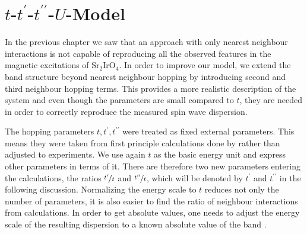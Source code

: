 \section{$t$-$t^{\prime}$-$t^{\prime \prime}$-$U$-Model}

In the previous chapter we saw that an approach with only nearest neighbour interactions  is not capable of reproducing all the observed features 
in the magnetic excitations of  Sr$_2$IrO$_4$.
In order to improve our model, we extend the band structure beyond nearest neighbour hopping by introducing second and third neighbour hopping terms.
This provides a more realistic description of the system and even though the parameters are small compared to $t$, 
they are needed in order to correctly reproduce the measured spin wave dispersion.


The hopping parameters $t,t^{\prime},t^{\prime \prime}$ were treated as fixed external parameters.
This means they were taken from first principle calculations done by 
\citet{PhysRevLett.106.136402} rather than adjusted to experiments.
We use again $t$ as the basic  energy unit and express other parameters in terms of it.
There are therefore two new parameters entering the calculations, the ratios $\nicefrac{t^{\prime}}{t}$ and $\nicefrac{t^{\prime \prime}}{t}$, 
which will be denoted by $t^{\prime}$ and 
$t^{\prime \prime}$ in the following discussion. 
Normalizing the energy scale to $t$ reduces not only the number of parameters, it is also easier to find the ratio of neighbour interactions from calculations.
In order to get  absolute values, one needs to adjust the energy scale of the resulting dispersion to a known absolute value of the band \cite{PhysRevB.67.064504}.


